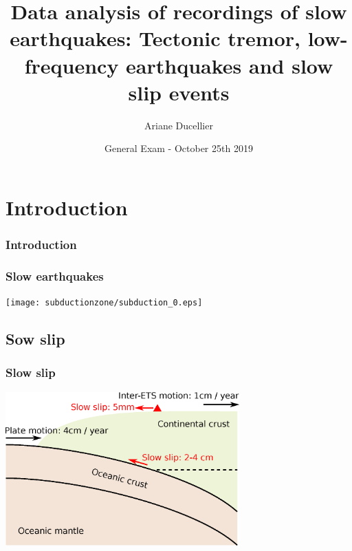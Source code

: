 \documentclass{beamer}
\title[Data analysis of recordings of slow earthquakes]{Data analysis of recordings of slow earthquakes: Tectonic tremor, low-frequency earthquakes and slow slip events}
\author{Ariane Ducellier}
\institute{University of Washington}
\date{General Exam - October 25th 2019}
\begin{document}
	\begin{frame}
		\titlepage
	\end{frame}


	\section{Introduction}

	\begin{frame}
		\frametitle{Introduction}
	\end{frame}

	\begin{frame}
		\frametitle{Slow earthquakes}
		\begin{center}
			\texttt{[image: subductionzone/subduction\_0.eps]}
		\end{center}
	\end{frame}


	\subsection{Sow slip}

	\begin{frame}
		\frametitle{Slow slip}
		\begin{center}
			\includegraphics[trim={0cm 0cm 0cm 0cm}, clip, width=9cm]{ETS/slow_slip.eps}
		\end{center}
	\end{frame}
\end{document}
